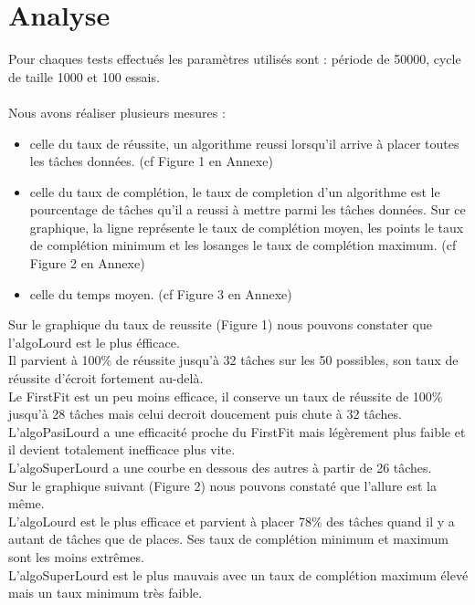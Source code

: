 \documentclass[11pt]{article}
\begin{document}
\section{Analyse}
Pour chaques tests effectués les paramètres utilisés sont : période de 50000, cycle de taille 1000 et 100 essais.\\
\\
Nous avons réaliser plusieurs mesures :
\begin{itemize}
    \item celle du taux de réussite, un algorithme reussi lorsqu'il arrive à placer toutes les tâches données. (cf Figure 1 en Annexe)
    \item celle du taux de complétion, le taux de completion d'un algorithme est le pourcentage de tâches qu'il a reussi à mettre parmi les tâches données. Sur ce graphique, la ligne représente le taux de complétion moyen, les points le taux de complétion minimum et les losanges le taux de complétion maximum. (cf Figure 2 en Annexe)
    \item celle du temps moyen. (cf Figure 3 en Annexe)\\
\end{itemize}

 Sur le graphique du taux de reussite (Figure 1) nous pouvons constater que l'algoLourd est le plus éfficace.\\
 Il parvient à 100\% de réussite jusqu'à 32 tâches sur les 50 possibles, son taux de réussite d'écroit fortement au-delà.\\
 Le FirstFit est un peu moins efficace, il conserve un taux de réussite de 100\% jusqu'à 28 tâches mais celui decroit doucement puis chute à 32 tâches.\\
 L'algoPasiLourd a une efficacité proche du FirstFit mais légèrement plus faible et il devient totalement inefficace plus vite.\\
 L'algoSuperLourd a une courbe en dessous des autres à partir de 26 tâches.\\

 Sur le graphique suivant (Figure 2) nous pouvons constaté que l'allure est la même.\\
L'algoLourd est le plus efficace et parvient à placer 78\% des tâches quand il y a autant de tâches que de places. Ses taux de complétion minimum et maximum sont les moins extrêmes.\\ 
L'algoSuperLourd est le plus mauvais avec un taux de complétion maximum élevé mais un taux minimum très faible.\\
\end{document}
